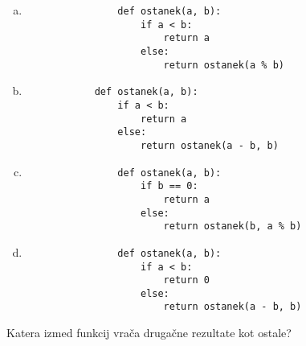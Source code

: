 \documentclass[arhiv, 10pt]{../izpit}
\begin{document}
        \begin{multicols}{2}
        \begin{enumerate}[(a)]
\item 
                \begin{verbatim}
                def ostanek(a, b):
                    if a < b:
                        return a
                    else:
                        return ostanek(a % b)
                \end{verbatim}
            
\item 
            \begin{verbatim}
            def ostanek(a, b):
                if a < b:
                    return a
                else:
                    return ostanek(a - b, b)
            \end{verbatim}
        
\item 
                \begin{verbatim}
                def ostanek(a, b):
                    if b == 0:
                        return a
                    else:
                        return ostanek(b, a % b)
                \end{verbatim}
            
\item 
                \begin{verbatim}
                def ostanek(a, b):
                    if a < b:
                        return 0
                    else:
                        return ostanek(a - b, b)
                \end{verbatim}
            
\end{enumerate}

        \end{multicols}
    
        \naloga*
        
        Katera izmed funkcij vrača drugačne rezultate kot ostale?
    
\end{document}
